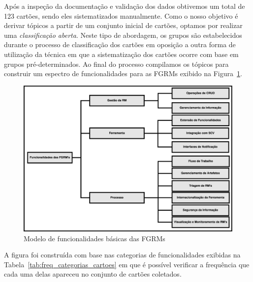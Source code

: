 Após a inspeção da documentação e validação dos dados obtivemos um total de 123
cartões, sendo eles sistematizados manualmente. Como o nosso objetivo é derivar
tópicos a partir de um conjunto inicial de cartões, optamos por realizar uma
\textit{classificação aberta}. Neste tipo de abordagem, os grupos são
estabelecidos durante o processo de classificação dos cartões em oposição a
outra forma de utilização da técnica em que a sistematização dos cartões ocorre
com base em grupos pré-determinados. Ao final do processo compilamos os tópicos
para construir um espectro de funcionalidades para as FGRMs exibido na
Figura~\ref{fig:diagrama-espectro-funcionalidades-fgrm}.

\begin{figure}[htpb]
	\centering
    \includegraphics[width=1.15\linewidth]{./chapter-estudo-funcionalidades-fgrm/img/diagrama-espectro-funcionalidades-fgrm.eps}
	\caption{Modelo de funcionalidades básicas das FGRMs}
\label{fig:diagrama-espectro-funcionalidades-fgrm}
\end{figure}

A figura foi construída com base nas categorias de funcionalidades exibidas na
Tabela~\ref{tab:freq_categorias_cartoes} em que é possível verificar a
frequência que cada uma delas apareceu no conjunto de cartões coletados.

